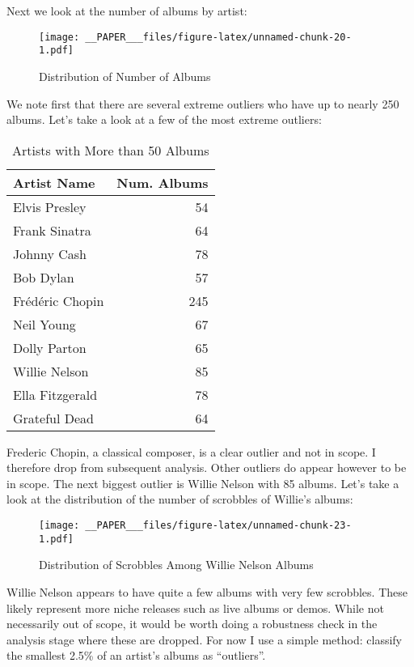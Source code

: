\documentclass[
  11pt,
]{article}
\begin{document}
Next we look at the number of albums by artist:

\begin{figure}
\centering
\texttt{[image: \_\_PAPER\_\_\_files/figure-latex/unnamed-chunk-20-1.pdf]}
\caption{Distribution of Number of Albums}
\end{figure}

We note first that there are several extreme outliers who have up to
nearly 250 albums. Let's take a look at a few of the most extreme
outliers:

\begin{table}[H]

\caption{\label{tab:unnamed-chunk-21}Artists with More than 50 Albums}
\centering
\begin{tabular}[t]{l|r}
\hline
Artist Name & Num. Albums\\
\hline
Elvis Presley & 54\\
\hline
Frank Sinatra & 64\\
\hline
Johnny Cash & 78\\
\hline
Bob Dylan & 57\\
\hline
Frédéric Chopin & 245\\
\hline
Neil Young & 67\\
\hline
Dolly Parton & 65\\
\hline
Willie Nelson & 85\\
\hline
Ella Fitzgerald & 78\\
\hline
Grateful Dead & 64\\
\hline
\end{tabular}
\end{table}

Frederic Chopin, a classical composer, is a clear outlier and not in
scope. I therefore drop from subsequent analysis. Other outliers do
appear however to be in scope. The next biggest outlier is Willie Nelson
with 85 albums. Let's take a look at the distribution of the number of
scrobbles of Willie's albums:

\begin{figure}
\centering
\texttt{[image: \_\_PAPER\_\_\_files/figure-latex/unnamed-chunk-23-1.pdf]}
\caption{Distribution of Scrobbles Among Willie Nelson Albums}
\end{figure}

Willie Nelson appears to have quite a few albums with very few
scrobbles. These likely represent more niche releases such as live
albums or demos. While not necessarily out of scope, it would be worth
doing a robustness check in the analysis stage where these are dropped.
For now I use a simple method: classify the smallest 2.5\% of an
artist's albums as ``outliers''.
\end{document}
